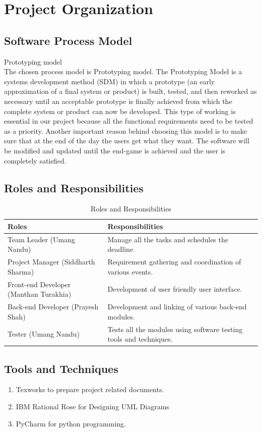 \section {Project Organization}
\subsection{Software Process Model}
Prototyping model\\
The chosen process model is Prototyping model. The Prototyping Model is a systems development method (SDM) in which a prototype (an early approximation of a final system or product) is built, tested, and then reworked as necessary until an acceptable prototype is finally achieved from which the complete system or product can now be developed. This type of working is essential in our project because all the functional requirements need to be tested as a priority. Another important reason behind choosing this model is to make sure that at the end of the day the users get what they want. The software will be modified and updated until the end-game is achieved and the user is completely satisfied.

\subsection{Roles and Responsibilities}
\begin{table}[h!]
\caption{Roles and Responsibilities}
\centering
    \begin{tabular}{|p{4cm}| p{9.5cm}|}
    \hline
    Roles & Responsibilities \\ 
    \hline
    Team Leader (Umang Nandu)& Manage all the tasks and schedules the deadline \\ 
     \hline
  Project Manager (Siddharth Sharma) & Requirement gathering and coordination of various events.\\ 
    \hline
    Front-end Developer (Manthan Turakhia) & Development of user friendly user interface.\\ 
    \hline
   Back-end Developer (Prayesh Shah) & Development and linking of various back-end modules.\\
   \hline
    Tester (Umang Nandu) & Tests all the modules using software testing tools and techniques.\\
\hline
\end{tabular}
\end{table}
\newpage
\subsection{Tools and Techniques}
\begin{enumerate}
\item Texworks to prepare project related documents.
\item IBM Rational Rose for Designing UML Diagrams
\item PyCharm for python programming.
\end{enumerate}
\newpage
